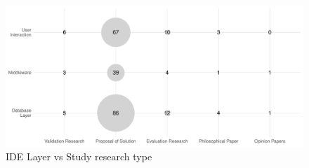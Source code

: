 \begin{figure}[hptb]
    \centering
    \includegraphics[width=\textwidth]{images/3_mapping/layer_vs_type}
    \caption{\gls{IDE} Layer vs Study research type}
    \label{fig:mapping/layer_vs_type}
\end{figure}

